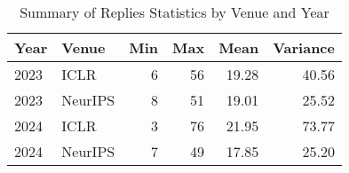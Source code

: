 \begin{table}
\centering
\caption{Summary of Replies Statistics by Venue and Year}
\label{tab:replies_stats}
\begin{tabular}{llrrrr}
\toprule
Year &   Venue &  Min &  Max &  Mean &  Variance \\
\midrule
2023 &    ICLR &            6 &           56 &     19.28 &         40.56 \\
2023 & NeurIPS &            8 &           51 &     19.01 &         25.52 \\
2024 &    ICLR &            3 &           76 &     21.95 &         73.77 \\
2024 & NeurIPS &            7 &           49 &     17.85 &         25.20 \\
\bottomrule
\end{tabular}
\end{table}
